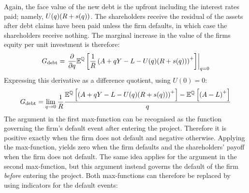 \documentclass[../main.tex]{subfiles}
\begin{document}
        Again, the face value of the new debt is the upfront including the interest rates paid;
        namely, $U(q)(R + s(q))$. 
        The shareholders receive the residual of the assets after debt claims have been paid
        unless the firm defaults, in which case the shareholders receive nothing. 
        The marginal increase in the value of the firms equity per unit investment is therefore:
            \begin{equation*}
                G_{\text{debt}} 
                = 
                \left.
                \frac{
                    \partial 
                }{
                    \partial 
                    q
                }
                \mathbb{E}^{\mathbb{Q}}\left[
                    \frac{1}{R} 
                    \left(
                        A + qY - L - U(q)(R + s(q))
                    \right)^{+}
                \right] 
                \right\rvert_{q=0} 
            \end{equation*}
        Expressing this derivative as a difference quotient, using $U(0)=0$:
            \begin{equation*}
                G_{\text{debt}} 
                =
                \lim_{q\rightarrow0} 
                \frac{1}{R}
                \frac{
                    \mathbb{E}^{\mathbb{Q}}\left[ 
                    \left(
                        A + qY - L - U(q)(R + s(q))
                    \right)^{+}
                    \right]
                    -
                    \mathbb{E}^{\mathbb{Q}}\left[ 
                    \left(
                        A - L
                    \right)^{+}
                \right] 
                }{
                    q
                } 
            \end{equation*}
        The argument in the first max-function can be recognised as the function 
        governing the firm's default event after entering the project. 
        Therefore it is positive exactly when the firm does not default and negative otherwise. 
        Applying the max-function, yields zero when the firm defaults
        and the shareholders' payoff when the firm does not default.
        The same idea applies for the argument in the second max-function,
        but this argument instead governs the default of the firm \textit{before} entering the project.
        Both max-functions can therefore be replaced by using indicators for the default events:
\end{document}
